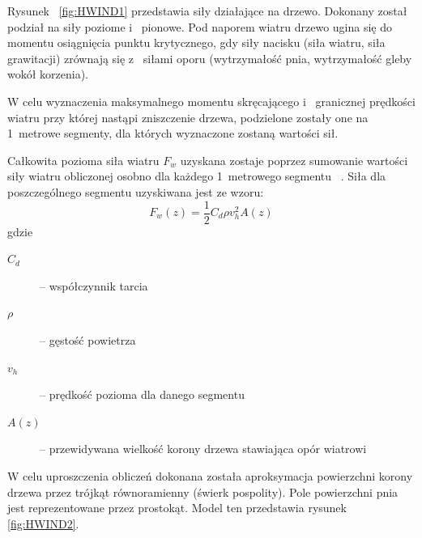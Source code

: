 \documentclass[a4paper,12pt]{article}
\begin{document}
Rysunek ~\ref{fig:HWIND1} przedstawia siły działające na drzewo. Dokonany został podział na siły poziome i ~pionowe.
Pod naporem wiatru drzewo ugina się do momentu osiągnięcia punktu krytycznego, gdy siły nacisku (siła wiatru, siła grawitacji) zrównają się z ~siłami oporu (wytrzymałość pnia, wytrzymałość gleby wokół korzenia).

W celu wyznaczenia maksymalnego momentu skręcającego i ~granicznej prędkości wiatru przy której nastąpi zniszczenie drzewa, podzielone zostały one na 1~metrowe segmenty, dla których wyznaczone zostaną wartości sił.

Całkowita pozioma siła wiatru $F_w$ uzyskana zostaje poprzez sumowanie wartości siły wiatru obliczonej osobno dla każdego 1~metrowego segmentu ~\cite{chm_mgza}. Siła dla poszczególnego segmentu uzyskiwana jest ze wzoru:
$$ F_w(z) = \frac{1}{2}C_d  \rho v_h^2 A(z) $$ 
gdzie

\begin{description}
  \item[$C_d$] -- współczynnik tarcia
  \item[$\rho$ ]-- gęstość powietrza
  \item[$v_h$ ]-- prędkość pozioma dla danego segmentu
  \item[$A(z)$]-- przewidywana wielkość korony drzewa stawiająca opór wiatrowi
\end{description}

W celu uproszczenia obliczeń dokonana została aproksymacja powierzchni korony drzewa przez trójkąt równoramienny (świerk pospolity). Pole powierzchni pnia jest reprezentowane przez prostokąt. Model ten przedstawia rysunek \ref{fig:HWIND2}.
\end{document}
